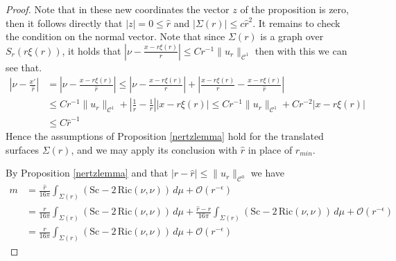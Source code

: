 \documentclass[12pt,a4paper]{amsart}
\theoremstyle{plain}
\theoremstyle{definition}
\begin{document}
\begin{proof}
Note that in these new coordinates the vector $z$ of the proposition is zero, then it follows directly that $|z|=0 \leq \hat{r}$ and
$|\Sigma(r)| \leq c \hat{r}^2$. It remains to check the condition  on the normal vector.  Note that since $\Sigma(r)$ is a graph over $S_r(r\xi(r))$, it holds that  $\left| \nu - \frac{x - r\xi(r)}{ r} \right|\leq C r^{-1}\|u_r\|_{\mathcal{C}^1} $ then with this we can see that.
\begin{equation*}
    \begin{split}
  \left| \nu - \frac{x' }{\, \hat{r}} \right| &=  \left| \nu - \frac{x - r\xi(r)}{ \hat{r}} \right| \leq \left| \nu - \frac{x - r\xi(r)}{ r} \right| +\left|\frac{x - r\xi(r)}{ r} - \frac{x - r\xi(r)}{ \hat{r}} \right|\\
  &\leq Cr^{-1} \|u_r\|_{\mathcal{C}^1} + \left| \frac{1}{\hat{r}}-\frac{1}{r} \right| |x - r\xi(r)|
  \leq   C r^{-1}\|u_r\|_{\mathcal{C}^1}+ C r^{-2}|x - r\xi(r)|  \\
  &\leq C\hat{r}^{-1}
    \end{split}
\end{equation*}
Hence the assumptions of Proposition \ref{nertzlemma} hold for the translated 
surfaces $\Sigma(r)$, and we may apply its conclusion with $\hat{r}$ in 
place of $r_{min}$.




 By  Proposition \ref{nertzlemma} and that $|r -\hat{r}| \leq \|u_r\|_{\mathcal{C}^0} $  we have 
\begin{equation}
    \begin{split}
       m&= \frac{\hat{r}}{16\pi} \int_{\Sigma(r)} (\mathrm{Sc} - 2\,\mathrm{Ric}(\nu,\nu)) \, d\mu + \mathcal{O}(r ^{-\epsilon})\\
       &=  \frac{r}{16\pi} \int_{\Sigma(r)} (\mathrm{Sc} - 2\,\mathrm{Ric}(\nu,\nu)) \, d\mu+ \frac{\hat{r} -r  }{16\pi} \int_{\Sigma(r)} (\mathrm{Sc} - 2\,\mathrm{Ric}(\nu,\nu)) \, d\mu + \mathcal{O}(r ^{-\epsilon}) \\
       &= \frac{r}{16\pi} \int_{\Sigma(r)} (\mathrm{Sc} - 2\,\mathrm{Ric}(\nu,\nu)) \, d\mu + \mathcal{O}(r ^{-\epsilon})
    \end{split}
\end{equation}


\end{proof}
\end{document}
